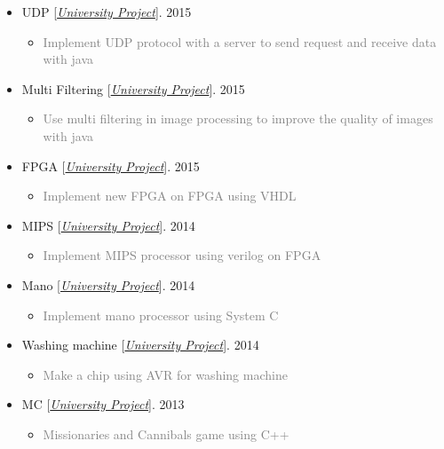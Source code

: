 \documentclass[10pt,a4paper,sans]{moderncv} %
\begin{document}
\begin{itemize}
		\item UDP [\href{https://sbu.ac.ir/Cols/CSE/Pages/default.aspx/}{\emph{University Project}}]. \hfill 2015
		\begin{itemize}
			\item \textcolor{gray} {Implement UDP protocol with a server to send request and receive data with java}
		\end{itemize}

		\item Multi Filtering [\href{https://sbu.ac.ir/Cols/CSE/Pages/default.aspx/}{\emph{University Project}}]. \hfill 2015
		\begin{itemize}
			\item \textcolor{gray} {Use multi filtering in image processing to improve the quality of images with java}
		\end{itemize}

		\item FPGA [\href{https://sbu.ac.ir/Cols/CSE/Pages/default.aspx/}{\emph{University Project}}]. \hfill 2015
		\begin{itemize}
			\item \textcolor{gray} {Implement new FPGA on FPGA using VHDL}
		\end{itemize}

		\item MIPS [\href{https://sbu.ac.ir/Cols/CSE/Pages/default.aspx/}{\emph{University Project}}]. \hfill 2014
		\begin{itemize}
			\item \textcolor{gray} {Implement MIPS processor using verilog on FPGA}
		\end{itemize}

		\item Mano [\href{https://sbu.ac.ir/Cols/CSE/Pages/default.aspx/}{\emph{University Project}}]. \hfill 2014
		\begin{itemize}
			\item \textcolor{gray} {Implement mano processor using System C}
		\end{itemize}

		\item Washing machine [\href{https://sbu.ac.ir/Cols/CSE/Pages/default.aspx/}{\emph{University Project}}]. \hfill 2014
		\begin{itemize}
			\item \textcolor{gray} {Make a chip using AVR for washing machine}
		\end{itemize}

		\item MC [\href{https://sbu.ac.ir/Cols/CSE/Pages/default.aspx/}{\emph{University Project}}]. \hfill 2013
		\begin{itemize}
			\item \textcolor{gray} {Missionaries and Cannibals game using C++}
		\end{itemize}


\end{itemize}
\end{document}
